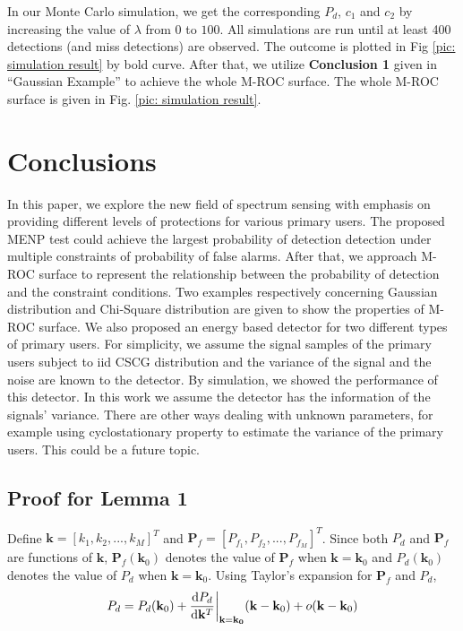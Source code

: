 \documentclass[12pt,journal,a4paper,twoside,onecolumn,draft]{IEEEtran}
\begin{document}
\begin{spacing}{2.5}
In our Monte Carlo simulation, we get the corresponding $P_d$, $c_1$ and $c_2$ by increasing the value of $\lambda$ from $0$ to $100$. All simulations are run until at least 400 detections (and miss detections) are observed. 
The outcome is plotted in Fig \ref{pic: simulation result} by bold curve. 
After that, we utilize \textbf{Conclusion 1} given in ``Gaussian Example'' to achieve the whole M-ROC surface. 
The whole M-ROC surface is given in Fig. \ref{pic: simulation result}.

\section{Conclusions}
In this paper, we explore the new field of spectrum sensing with emphasis on providing different levels of protections for various primary users. 
The proposed MENP test could achieve the largest probability of detection detection under multiple constraints of probability of false alarms. 
After that, we approach M-ROC surface to represent the relationship between the probability of detection and the constraint conditions. Two examples respectively concerning Gaussian distribution and Chi-Square distribution are given to show the properties of M-ROC surface. 
We also proposed an energy based detector for two different types of primary users.
For simplicity, we assume the signal samples of the primary users subject to iid CSCG distribution and the variance of the signal and the noise are known to the detector.
By simulation, we showed the performance of this detector. 
In this work we assume the detector has the information of the signals' variance. There are other ways dealing with unknown parameters, for example using cyclostationary property to estimate the variance of the primary users. This could be a future topic.  

\appendix
\subsection{Proof for Lemma 1}

Define $\mathbf{k} = [k_1, k_2, ..., k_M]^T$ and $\mathbf{P}_f = [P_{f_1}, P_{f_2}, ..., P_{f_M}]^T$. Since both $P_d$ and $\mathbf{P}_f$ are functions of $\mathbf{k}$, $\mathbf{P}_f(\mathbf{k}_0)$ denotes the value of $\mathbf{P}_f$ when $\mathbf{k} = \mathbf{k}_0$ and $P_d(\mathbf{k}_0)$ denotes the value of $P_d$ when $\mathbf{k} = \mathbf{k}_0$. Using Taylor's expansion for $\mathbf{P}_f$ and $P_d$,
\begin{equation}
\label{pro: pd}
P_d = P_d(\mathbf{k}_0) + \frac{\mathrm{d}P_d}{\mathrm{d}\mathbf{k}^T}\bigg{|}_{\mathbf{k}=\mathbf{k_0}}(\mathbf{k} - \mathbf{k}_0)
+ o(\mathbf{k} - \mathbf{k}_0)
\end{equation}


\end{spacing}
\end{document}
